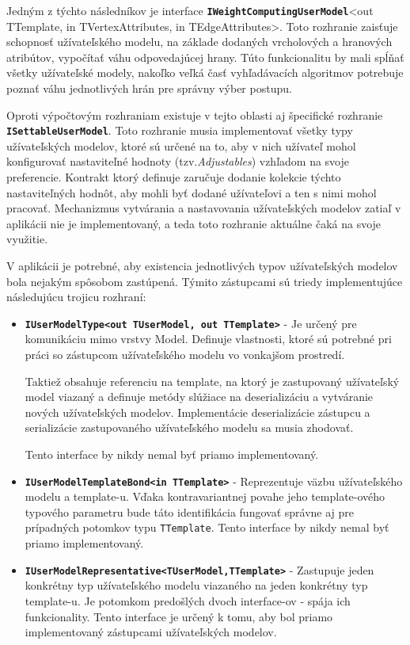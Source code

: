 Jedným z týchto následníkov je interface \textbf{\texttt{IWeightComputingUserModel}}<out TTemplate, in TVertexAttributes, in TEdgeAttributes>. Toto rozhranie zaisťuje schopnosť užívateľského modelu, na základe dodaných vrcholových a hranových atribútov, vypočítať váhu odpovedajúcej hrany. Túto funkcionalitu by mali spĺňať všetky užívateľské modely, nakoľko veľká časť vyhľadávacích algoritmov potrebuje poznať váhu jednotlivých hrán pre správny výber postupu.

Oproti výpočtovým rozhraniam existuje v tejto oblasti aj špecifické rozhranie \textbf{\texttt{ISettableUserModel}}. Toto rozhranie musia implementovať všetky typy užívateľských modelov, ktoré sú určené na to, aby v nich užívateľ mohol konfigurovať nastaviteľné hodnoty (tzv.\textit{Adjustables}) vzhľadom na svoje preferencie. Kontrakt ktorý definuje zaručuje dodanie kolekcie týchto nastaviteľných hodnôt, aby mohli byť dodané užívateľovi a ten s nimi mohol pracovať. Mechanizmus vytvárania a nastavovania užívateľských modelov zatiaľ v aplikácii nie je implementovaný, a teda toto rozhranie aktuálne čaká na svoje využitie.  

\bigskip

V aplikácii je potrebné, aby existencia jednotlivých typov užívateľských modelov bola nejakým spôsobom zastúpená. Týmito zástupcami sú triedy implementujúce následujúcu trojicu rozhraní:
\begin{itemize}
    \item \textbf{\texttt{IUserModelType<out TUserModel, out TTemplate>}} - Je určený pre komunikáciu mimo vrstvy Model. Definuje vlastnosti, ktoré sú potrebné pri práci so zástupcom užívateľského modelu vo vonkajšom prostredí. 
    
    Taktiež obsahuje referenciu na template, na ktorý je zastupovaný užívateľský model viazaný a definuje metódy slúžiace na deserializáciu a vytváranie nových užívateľských modelov. Implementácie deserializácie zástupcu a serializácie zastupovaného užívateľského modelu sa musia zhodovať. 
    
    Tento interface by nikdy nemal byť priamo implementovaný.
    \item \textbf{\texttt{IUserModelTemplateBond<in TTemplate>}} - Reprezentuje väzbu užívateľského modelu a template-u.  Vďaka kontravariantnej povahe jeho template-ového typového parametru bude táto identifikácia fungovať správne aj pre prípadných potomkov typu \texttt{TTemplate}. Tento interface by nikdy nemal byť priamo implementovaný.
    \item \textbf{\texttt{IUserModelRepresentative<TUserModel,TTemplate>}} - Zastupuje jeden konkrétny typ užívateľského modelu viazaného na jeden konkrétny typ template-u. Je potomkom predošlých dvoch interface-ov - spája ich funkcionality. Tento interface je určený k tomu, aby bol priamo implementovaný zástupcami užívateľských modelov.   
\end{itemize}

